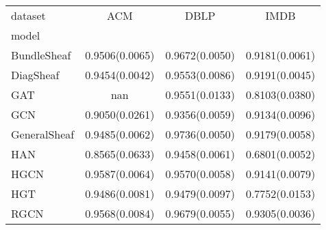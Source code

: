 \begin{tabular}{lSSS}
\toprule
{dataset} & {ACM} & {DBLP} & {IMDB} \\
{model} & {} & {} & {} \\
\midrule
BundleSheaf & 0.9506(0.0065) & 0.9672(0.0050) & 0.9181(0.0061) \\
DiagSheaf & 0.9454(0.0042) & 0.9553(0.0086) & 0.9191(0.0045) \\
GAT & nan & 0.9551(0.0133) & 0.8103(0.0380) \\
GCN & 0.9050(0.0261) & 0.9356(0.0059) & 0.9134(0.0096) \\
GeneralSheaf & 0.9485(0.0062) & 0.9736(0.0050) & 0.9179(0.0058) \\
HAN & 0.8565(0.0633) & 0.9458(0.0061) & 0.6801(0.0052) \\
HGCN & 0.9587(0.0064) & 0.9570(0.0058) & 0.9141(0.0079) \\
HGT & 0.9486(0.0081) & 0.9479(0.0097) & 0.7752(0.0153) \\
RGCN & 0.9568(0.0084) & 0.9679(0.0055) & 0.9305(0.0036) \\
\bottomrule
\end{tabular}
